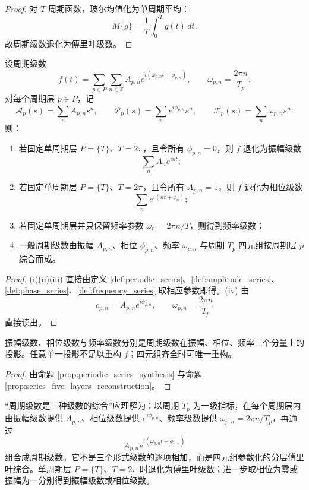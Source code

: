 \begin{proof}
对 $T$-周期函数，玻尔均值化为单周期平均：
\[
M\{g\} = \frac{1}{T}\int_0^T g(t)\,dt.
\]
故周期级数退化为傅里叶级数。
\end{proof}

\begin{proposition}\label{prop:periodic_series_synthesis}
设周期级数
\[
f(t)=\sum_{p\in P}\sum_{n\in\mathbb Z}A_{p,n}e^{i(\omega_{p,n}t+\phi_{p,n})},
\qquad \omega_{p,n}=\frac{2\pi n}{T_p}.
\]
对每个周期层 $p\in P$，记
\[
\mathcal A_p(s)=\sum_n A_{p,n}s^n,\qquad
\mathcal P_p(s)=\sum_n e^{i\phi_{p,n}}s^n,\qquad
\mathcal F_p(s)=\sum_n \omega_{p,n}s^n.
\]
则：
\begin{enumerate}[label=(\roman*)]
    \item 若固定单周期层 $P=\{T\}$、$T=2\pi$，且令所有 $\phi_{p,n}=0$，则 $f$ 退化为振幅级数
    \[
    \sum_n A_n e^{int};
    \]
    \item 若固定单周期层 $P=\{T\}$、$T=2\pi$，且令所有 $A_{p,n}=1$，则 $f$ 退化为相位级数
    \[
    \sum_n e^{i(nt+\phi_n)};
    \]
    \item 若固定单周期层并只保留频率参数 $\omega_n=2\pi n/T$，则得到频率级数；
    \item 一般周期级数由振幅 $A_{p,n}$、相位 $\phi_{p,n}$、频率 $\omega_{p,n}$ 与周期 $T_p$ 四元组按周期层 $p$ 综合而成。
\end{enumerate}
\end{proposition}

\begin{proof}
(i)(ii)(iii) 直接由定义 \ref{def:periodic_series}、\ref{def:amplitude_series}、\ref{def:phase_series}、\ref{def:frequency_series} 取相应参数即得。(iv) 由
\[
c_{p,n}=A_{p,n}e^{i\phi_{p,n}},\qquad \omega_{p,n}=\frac{2\pi n}{T_p}
\]
直接读出。
\end{proof}

\begin{corollary}[三种级数是周期级数的投影]\label{cor:periodic_series_projections}
振幅级数、相位级数与频率级数分别是周期级数在振幅、相位、频率三个分量上的投影。任意单一投影不足以重构 $f$；四元组齐全时可唯一重构。
\end{corollary}

\begin{proof}
由命题 \ref{prop:periodic_series_synthesis} 与命题 \ref{prop:series_five_layers_reconstruction}。
\end{proof}

\begin{remark}[“综合”的准确含义]\label{rem:periodic_series_synthesis_scope}
“周期级数是三种级数的综合”应理解为：以周期 $T_p$ 为一级指标，在每个周期层内由振幅级数提供 $A_{p,n}$、相位级数提供 $e^{i\phi_{p,n}}$、频率级数提供 $\omega_{p,n}=2\pi n/T_p$，再通过
\[
A_{p,n}e^{i(\omega_{p,n}t+\phi_{p,n})}
\]
组合成周期级数。它不是三个形式级数的逐项相加，而是四元组参数化的分层傅里叶综合。单周期层 $P=\{T\}$、$T=2\pi$ 时退化为傅里叶级数；进一步取相位为零或振幅为一分别得到振幅级数或相位级数。
\end{remark}

